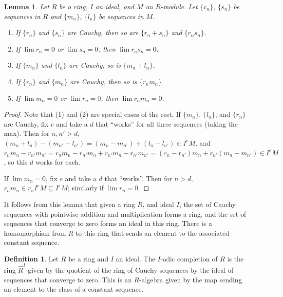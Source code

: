 \documentclass{amsart}[12pt]
\numberwithin{equation}{section}
\theoremstyle{plain} %
\newtheorem{lem}[equation]{Lemma}
\theoremstyle{definition}
\newtheorem{defn}[equation]{Definition}
\theoremstyle{remark}
\begin{document}
\begin{lem}
Let $R$ be a ring, $I$ an ideal, and $M$ an $R$-module. Let $\{r_n\}$, $\{s_n\}$ be sequences in $R$ and $\{m_n\}$, $\{l_n\}$ be sequences in $M$.
\begin{enumerate}
\item If $\{ r_n\}$ and $\{s_n\}$ are Cauchy, then so are $\{ r_n+s_n\}$ and $\{ r_n s_n\}$.
\item If $\lim r_n =0$ or $\lim s_n=0$, then $\lim r_n s_n =0$.
\item If $\{m_n\}$ and $\{l_n\}$ are Cauchy, so is $\{m_n + l_n\}$.
\item If $\{ r_n\}$ and $\{m_n\}$ are Cauchy, then so is $\{r_n m_n\}$.
\item If $\lim m_n=0$ or $\lim r_n=0$, then $\lim r_n m_n=0$.
\end{enumerate}
\end{lem}
\begin{proof} Note that (1) and (2) are special cases of the rest. 
If $\{m_n\}$, $\{l_n\}$, and $\{r_n\}$ are Cauchy, fix $e$ and take a $d$ that ``works'' for all three sequences (taking the max). Then for $n,n'>d$, $(m_n + l_n) - (m_{n'} + l_{n'}) =(m_n - m_{n'}) + (l_n - l_{n'}) \in I^eM$, and $r_n m_n - r_{n'} m_{n'} = r_n m_n - r_{n'} m_n + r_{n'} m_n - r_{n'} m_{n'} = (r_n - r_{n'}) m_n + r_{n'} (m_n - m_{n'}) \in I^e M$, so this $d$ works for each.

If $\lim m_n = 0$, fix $e$ and take a $d$ that ``works''. Then for $n>d$, $r_n m_n \in r_n I^e M \subseteq I^e M$; similarly if $\lim r_n =0$.
\end{proof}

It follows from this lemma that given a ring $R$, and ideal $I$, the set of Cauchy sequences with pointwise addition and multiplication forms a ring, and the set of sequences that converge to zero forms an ideal in this ring. There is a homomorphism from $R$ to this ring that sends an element to the associated constant sequence. 


\begin{defn} Let $R$ be a ring and $I$ an ideal. The $I$-adic completion of $R$ is the ring $\hat{R}^I$ given by the quotient of the ring of Cauchy sequences by the ideal of sequences that converge to zero. This is an $R$-algebra given by the map sending an element to the class of a constant sequence.
\end{defn}


\end{document}
